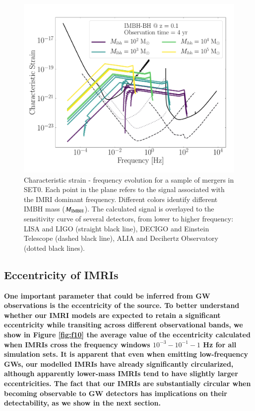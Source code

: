 \documentclass[article]{aa}
\newcommand{\ibh}{{\rm IMBH}}
\begin{document}
{\begin{figure}
\centering
\includegraphics[width=\columnwidth]{test}
\caption{Characteristic strain - frequency evolution for a sample of mergers in SET0. Each point in the plane refers to the signal associated with the IMRI dominant frequency. Different colors identify different IMBH mass ($M_\ibh$). The calculated signal is overlayed to the sensitivity curve of several detectors, from lower to higher frequency: LISA and LIGO (straight black line), DECIGO and Einstein Telescope (dashed black line), ALIA and Decihertz Observatory (dotted black lines).}
\label{fig:f13}
\end{figure}

}

\subsection{Eccentricity of IMRIs}
{\bf
One important parameter that could be inferred from GW observations is the eccentricity of the source. To better understand whether our IMRI models are expected to retain a significant eccentricity while transiting across different observational bands, we show in Figure \ref{fig:f10} the average value of the eccentricity calculated when IMRIs cross the frequency windows $10^{-3}-10^{-1}-1$ Hz for all simulation sets. It is apparent that even when emitting low-frequency GWs, our modelled IMRIs have already significantly circularized, although apparently lower-mass IMRIs tend to have slightly larger eccentricities. The fact that our IMRIs are substantially circular when becoming observable to GW detectors has implications on their detectability, as we show in the next section.
}
\end{document}
